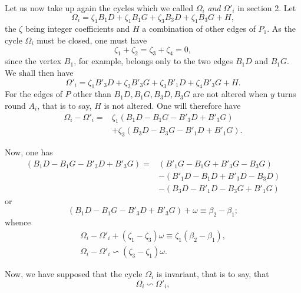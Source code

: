 \documentclass{article}
\begin{document}
Let us now take up again the cycles which we called $\Omega_{i}$ \emph{and} $\Omega'_{i}$ in section 2. Let
\[ \Omega_{i} = \zeta_{1} B_{1}D + \zeta_{1} B_{1}G + \zeta_{3} B_{3}D + \zeta_{1} B_{3}G + H, \]
the $\zeta$ being integer coefficients and $H$ a combination of other edges of $P_{1}$. As the cycle $\Omega_{i}$ must be closed, one must have
\[ \zeta_{1} + \zeta_{2} = \zeta_{3} + \zeta_{4} = 0, \]
since the vertex $B_{1}$, for example, belongs only to the two edges $B_{1}D$ and $B_{1}G$. We shall then have
\[ \Omega'_{i} = \zeta_{1} B'_{3}D + \zeta_{2} B'_{3}G + \zeta_{3} B'_{1}D + \zeta_{4} B'_{3}G + H. \]
For the edges of $P$ other than $B_{1}D, B_{1}G, B_{3}D, B_{3}G$ are not altered when $y$ turns round $A_{i}$, that is to say, $H$ is not altered. One will therefore have
\[ \begin{aligned} \Omega_{i} - \Omega'_{i} = {}&\zeta_{1}(B_{1}D - B_{1}G - B'_{3}D + B'_{3}G)\\ &+ \zeta_{3}(B_{3}D - B_{3}G - B'_{1}D + B'_{1}G). \end{aligned} \]

Now, one has
\[ \begin{aligned} (B_{1}D - B_{1}G - B'_{3}D + B'_{3}G) = {}&(B'_{1}G - B_{1}G + B'_{3}G - B_{3}G)\\ &- (B'_{1}D - B_{1}D + B'_{3}D - B_{3}D)\\ &- (B_{3}D - B'_{1}D - B_{3}G + B'_{1}G) \end{aligned} \]
or
\[ (B_{1}D - B_{1}G - B'_{3}D + B'_{3}G) + \omega \equiv \beta_{2} - \beta_{1}; \]
whence
\[ \begin{gathered} \Omega_{i} - \Omega'_{i} + (\zeta_{1} - \zeta_{3})\omega \equiv \zeta_{1}(\beta_{2} - \beta_{1}),\\ \Omega_{i} - \Omega'_{i} \backsim (\zeta_{3} - \zeta_{1})\omega. \end{gathered} \]

Now, we have supposed that the cycle $\Omega_{i}$ is invariant, that is to say, that
\[ \Omega_{i} \backsim \Omega'_{i}, \]
\end{document}
